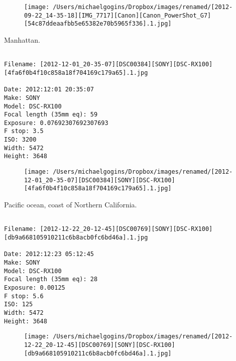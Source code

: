\documentclass[11pt,letter,DIV=14,paper=landscape]{scrbook}
\begin{document}
\begin{figure}
\texttt{[image: /Users/michaelgogins/Dropbox/images/renamed/[2012-09-22\_14-35-18][IMG\_7717][Canon][Canon\_PowerShot\_G7][54c87ddeaafbb5e65382e70b5965f336].1.jpg]}
\end{figure}
    
\clearpage
\noindent Manhattan.
\noindent
\begin{lstlisting}

Filename: [2012-12-01_20-35-07][DSC00384][SONY][DSC-RX100][4fa6f0b4f10c858a18f704169c179a65].1.jpg

Date: 2012:12:01 20:35:07
Make: SONY
Model: DSC-RX100
Focal length (35mm eq): 59
Exposure: 0.07692307692307693
F stop: 3.5
ISO: 3200
Width: 5472
Height: 3648
\end{lstlisting}
\clearpage

\begin{figure}
\texttt{[image: /Users/michaelgogins/Dropbox/images/renamed/[2012-12-01\_20-35-07][DSC00384][SONY][DSC-RX100][4fa6f0b4f10c858a18f704169c179a65].1.jpg]}
\end{figure}
    
\clearpage
\noindent Pacific ocean, coast of Northern California.
\noindent
\begin{lstlisting}

Filename: [2012-12-22_20-12-45][DSC00769][SONY][DSC-RX100][db9a668105910211c6b8acb0fc6bd46a].1.jpg

Date: 2012:12:23 05:12:45
Make: SONY
Model: DSC-RX100
Focal length (35mm eq): 28
Exposure: 0.00125
F stop: 5.6
ISO: 125
Width: 5472
Height: 3648
\end{lstlisting}
\clearpage

\begin{figure}
\texttt{[image: /Users/michaelgogins/Dropbox/images/renamed/[2012-12-22\_20-12-45][DSC00769][SONY][DSC-RX100][db9a668105910211c6b8acb0fc6bd46a].1.jpg]}
\end{figure}
    
\end{document}

